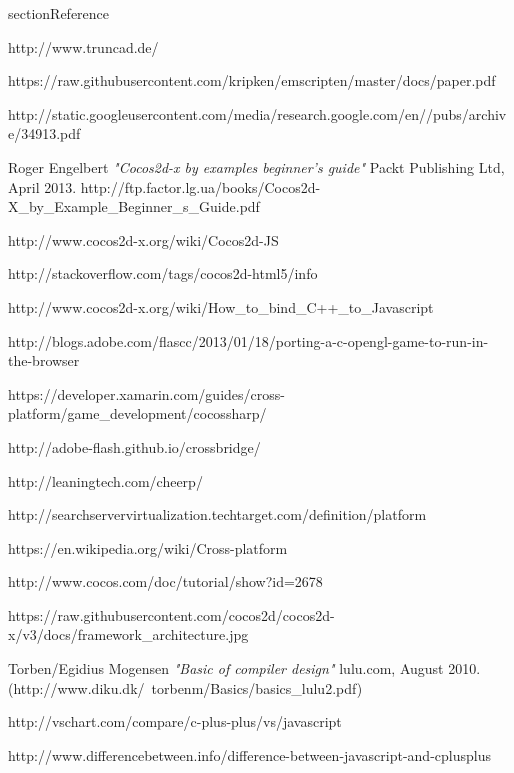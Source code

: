 \documentclass[23pt]{article}
\begin{document}
\newpage
section{Reference}

\begin{thebibliography}{9}

{http://www.truncad.de/}

{https://raw.githubusercontent.com/kripken/emscripten/master/docs/paper.pdf}

{http://static.googleusercontent.com/media/research.google.com/en//pubs/archive/34913.pdf}


 Roger Engelbert
\textit{"Cocos2d-x by examples beginner’s guide"}
 Packt Publishing Ltd, April 2013.
{http://ftp.factor.lg.ua/books/Cocos2d-X\_by\_Example\_Beginner\_s\_Guide.pdf}

{http://www.cocos2d-x.org/wiki/Cocos2d-JS}


{http://stackoverflow.com/tags/cocos2d-html5/info}


{http://www.cocos2d-x.org/wiki/How\_to\_bind\_C++\_to\_Javascript}

{http://blogs.adobe.com/flascc/2013/01/18/porting-a-c-opengl-game-to-run-in-the-browser}

{https://developer.xamarin.com/guides/cross-platform/game\_development/cocossharp/}


{http://adobe-flash.github.io/crossbridge/}

{http://leaningtech.com/cheerp/}

{http://searchservervirtualization.techtarget.com/definition/platform}


{https://en.wikipedia.org/wiki/Cross-platform}

{http://www.cocos.com/doc/tutorial/show?id=2678}

{https://raw.githubusercontent.com/cocos2d/cocos2d-x/v3/docs/framework\_architecture.jpg}

Torben/Egidius Mogensen
\textit{"Basic of compiler design"}
 lulu.com, August 2010.
{   (http://www.diku.dk/~torbenm/Basics/basics\_lulu2.pdf)}

{http://vschart.com/compare/c-plus-plus/vs/javascript}


{http://www.differencebetween.info/difference-between-javascript-and-cplusplus}



\end{thebibliography}
\end{document}
